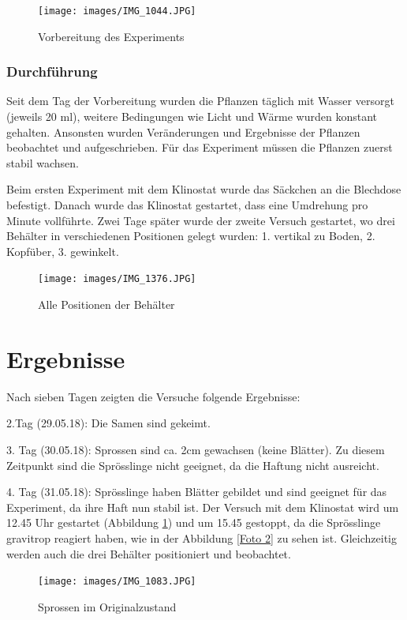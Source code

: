 \documentclass[
11pt, 
ngerman,
listof=totocnumbered,
oneside,
bibliography=totocnumbered,
abstracton
]{scrreprt}
\begin{document}
\begin{figure}[H]
	\centering 
	\texttt{[image: images/IMG\_1044.JPG]}
	\caption{Vorbereitung des Experiments}
\end{figure}


\subsubsection{Durchführung}

Seit dem Tag der Vorbereitung wurden die Pflanzen täglich mit Wasser versorgt (jeweils 20 ml), weitere Bedingungen wie Licht und Wärme wurden konstant gehalten. Ansonsten wurden Veränderungen und Ergebnisse der Pflanzen beobachtet und aufgeschrieben.
Für das Experiment müssen die Pflanzen zuerst stabil wachsen.

Beim ersten Experiment mit dem Klinostat wurde das Säckchen an die Blechdose befestigt. Danach wurde das Klinostat gestartet, dass eine Umdrehung pro Minute vollführte. Zwei Tage später wurde der zweite Versuch gestartet, wo drei Behälter in verschiedenen Positionen gelegt wurden: 1. vertikal zu Boden, 2. Kopfüber, 3. gewinkelt.


\begin{figure}[H]
	\centering 
	\texttt{[image: images/IMG\_1376.JPG]}
	\caption{Alle Positionen der Behälter}
\end{figure} 


\section{Ergebnisse}

Nach sieben Tagen zeigten die Versuche folgende Ergebnisse:

2.Tag (29.05.18): Die Samen sind gekeimt. 

3. Tag (30.05.18): Sprossen sind ca. 2cm gewachsen (keine Blätter).
Zu diesem Zeitpunkt sind die Sprösslinge nicht geeignet, da die Haftung nicht ausreicht. 

4. Tag (31.05.18): Sprösslinge haben Blätter gebildet und sind geeignet für das Experiment, da ihre Haft nun stabil ist. Der Versuch mit dem Klinostat wird um 12.45 Uhr gestartet (Abbildung \ref{Foto 1}) und um 15.45 gestoppt, da die Sprösslinge gravitrop reagiert haben, wie in der Abbildung \ref{Foto 2} zu sehen ist. Gleichzeitig werden auch die drei Behälter positioniert und beobachtet.

\begin{figure}[H]
	  \centering 
	  \texttt{[image: images/IMG\_1083.JPG]}
	  \caption{Sprossen im Originalzustand \label{Foto 1}}
\end{figure}
\end{document}
